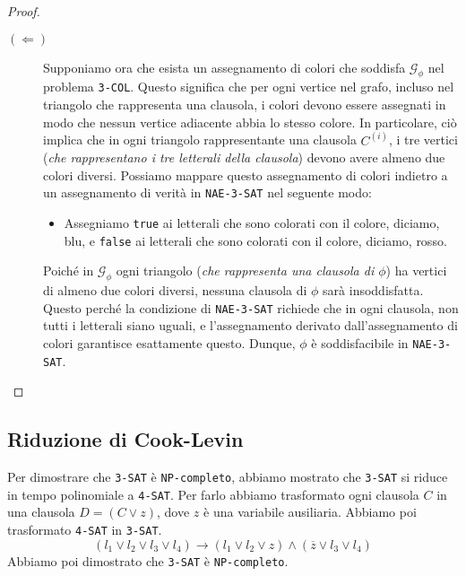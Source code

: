 \begin{proof}
\begin{description}
\begin{figure}[H]
        \end{figure}
        \item[$(\Leftarrow)$] Supponiamo ora che esista un assegnamento di colori che soddisfa
        \(\mathcal{G}_\phi\) nel problema \texttt{3-COL}. Questo significa che per ogni vertice
        nel grafo, incluso nel triangolo che rappresenta una clausola, i colori devono essere
        assegnati in modo che nessun vertice adiacente abbia lo stesso colore. In particolare,
        ciò implica che in ogni triangolo rappresentante una clausola \(C^{(i)}\), i tre vertici
        (\textit{che rappresentano i tre letterali della clausola}) devono avere almeno due colori
        diversi. Possiamo mappare questo assegnamento di colori indietro a un assegnamento di
        verità in \texttt{NAE-3-SAT} nel seguente modo:
        \begin{itemize}
            \item Assegniamo \texttt{true} ai letterali che sono colorati con il colore, diciamo,
            blu, e \texttt{false} ai letterali che sono colorati con il colore, diciamo, rosso.
        \end{itemize}
        Poiché in \(\mathcal{G}_\phi\) ogni triangolo (\textit{che rappresenta una clausola di \(\phi\)})
        ha vertici di almeno due colori diversi, nessuna clausola di \(\phi\) sarà insoddisfatta.
        Questo perché la condizione di \texttt{NAE-3-SAT} richiede che in ogni clausola, non tutti
        i letterali siano uguali, e l'assegnamento derivato dall'assegnamento di colori garantisce
        esattamente questo. Dunque, \(\phi\) è soddisfacibile in \texttt{NAE-3-SAT}.
    \end{description}
\end{proof}
\subsection{Riduzione di Cook-Levin}
Per dimostrare che \texttt{3-SAT} è \texttt{NP-completo}, abbiamo mostrato che
\texttt{3-SAT} si riduce in tempo polinomiale a \texttt{4-SAT}. Per farlo abbiamo
trasformato ogni clausola $C$ in una clausola $D = (C \lor z)$, dove $z$ è una
variabile ausiliaria. Abbiamo poi trasformato \texttt{4-SAT} in \texttt{3-SAT}.
\[
  (l_1 \lor l_2 \lor l_3 \lor l_4) \rightarrow (l_1 \lor l_2 \lor z) \land
  (\overline{z} \lor l_3 \lor l_4)
\]
Abbiamo poi dimostrato che \texttt{3-SAT} è \texttt{NP-completo}.


